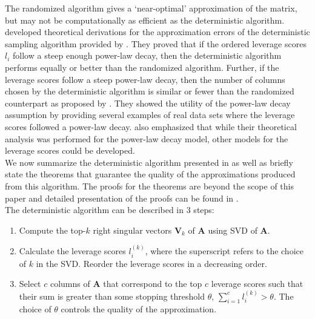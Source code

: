 The randomized algorithm gives a `near-optimal' approximation of the matrix, but may not be computationally as efficient as the deterministic algorithm.  \cite{papailiopoulos_provable_2014} developed theoretical derivations for the approximation errors of the deterministic sampling algorithm provided by \cite{jolliffe_discarding_1972}. They proved that if the ordered leverage scores $l_i$  follow a steep enough power-law decay, then the deterministic algorithm performs equally or better than the randomized algorithm. Further, if the leverage scores follow a steep power-law decay, then the number of columns chosen by the deterministic algorithm is similar or fewer than the randomized counterpart as proposed by \cite{drineas_relative-error_2008}. They showed the utility of the power-law decay assumption by providing several examples of real data sets where the leverage scores followed a power-law decay. \cite{papailiopoulos_provable_2014} also emphasized that while their theoretical analysis was performed for the power-law decay model, other models for the leverage scores could be developed. \\

We now summarize the deterministic algorithm presented in \cite{papailiopoulos_provable_2014} as well as briefly state the theorems that guarantee the quality of the approximations produced from this algorithm. The proofs for the theorems are beyond the scope of this paper and detailed presentation of the proofs can be found in \cite{papailiopoulos_provable_2014}. \\

\noindent The deterministic algorithm can be described in 3 steps:

\begin{enumerate}
    \item Compute the top-$k$ right singular vectors $\textbf{V}_k$ of $\textbf{A}$ using SVD of $\textbf{A}$.
    \item Calculate the leverage scores $l_i^{(k)}$,  where the superscript refers to the choice of $k$ in the SVD. Reorder the leverage scores in a decreasing order. 
    \item Select $c$ columns of $\textbf{A}$ that correspond to the top $c$ leverage scores such that their sum is greater than some stopping threshold $\theta$, $\sum_{i=1}^c l_i^{(k)}>\theta$. The choice of $\theta$ controls the quality of the approximation. 
\end{enumerate}


